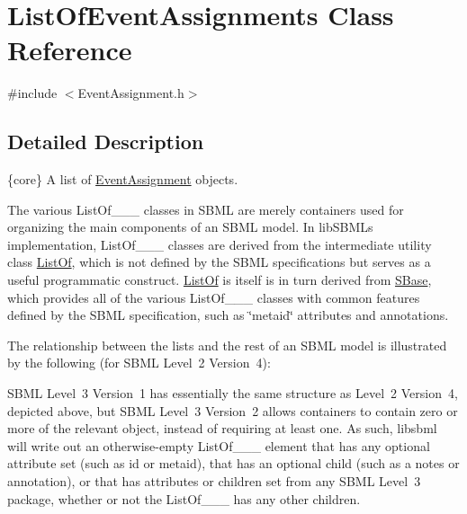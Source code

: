 \hypertarget{class_list_of_event_assignments}{}\section{List\+Of\+Event\+Assignments Class Reference}
\label{class_list_of_event_assignments}


{\ttfamily \#include $<$Event\+Assignment.\+h$>$}



\subsection{Detailed Description}
\{core\} A list of \hyperlink{class_event_assignment}{Event\+Assignment} objects.

\begin{DoxyParagraph}{}
The various List\+Of\+\_\+\+\_\+\+\_\+ classes in S\+B\+ML are merely containers used for organizing the main components of an S\+B\+ML model. In lib\+S\+B\+ML\textquotesingle{}s implementation, List\+Of\+\_\+\+\_\+\+\_\+ classes are derived from the intermediate utility class \hyperlink{class_list_of}{List\+Of}, which is not defined by the S\+B\+ML specifications but serves as a useful programmatic construct. \hyperlink{class_list_of}{List\+Of} is itself is in turn derived from \hyperlink{class_s_base}{S\+Base}, which provides all of the various List\+Of\+\_\+\+\_\+\+\_\+ classes with common features defined by the S\+B\+ML specification, such as \char`\"{}metaid\char`\"{} attributes and annotations.
\end{DoxyParagraph}
The relationship between the lists and the rest of an S\+B\+ML model is illustrated by the following (for S\+B\+ML Level~2 Version~4)\+:



S\+B\+ML Level~3 Version~1 has essentially the same structure as Level~2 Version~4, depicted above, but S\+B\+ML Level~3 Version~2 allows containers to contain zero or more of the relevant object, instead of requiring at least one. As such, libsbml will write out an otherwise-\/empty List\+Of\+\_\+\+\_\+\+\_\+ element that has any optional attribute set (such as \textquotesingle{}id\textquotesingle{} or \textquotesingle{}metaid\textquotesingle{}), that has an optional child (such as a \textquotesingle{}notes\textquotesingle{} or \textquotesingle{}annotation\textquotesingle{}), or that has attributes or children set from any S\+B\+ML Level~3 package, whether or not the List\+Of\+\_\+\+\_\+\+\_\+ has any other children.

